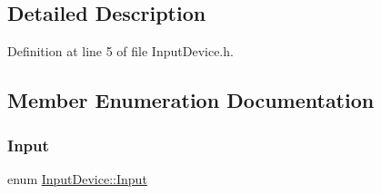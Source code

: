\subsection{Detailed Description}


Definition at line 5 of file Input\+Device.\+h.



\subsection{Member Enumeration Documentation}
\mbox{\label{class_input_device_a75152d8f06b6d032036014e42e44688b}} 
\subsubsection{\texorpdfstring{Input}{Input}}
{\footnotesize\ttfamily enum \hyperlink{class_input_device_a75152d8f06b6d032036014e42e44688b}{Input\+Device\+::\+Input}}

